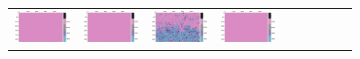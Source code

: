\documentclass{ipol}
\begin{document}
\begin{figure}[ht]
\begin{subfigure}[t]{\linewidth}
\begin{tabular}{ccccccccc}
                \includegraphics[width=\s]{images/flowers/AHD/iso_64_grids.png}&
                \includegraphics[width=\s]{images/flowers/DCB/iso_64_grids.png}&
                \includegraphics[width=\s]{images/flowers/DHT/iso_64_grids.png}&
                \includegraphics[width=\s]{images/flowers/LINEAR/iso_64_grids.png}&

\end{tabular}
\end{subfigure}
\end{figure}
\end{document}
